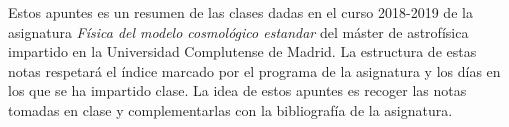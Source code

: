Estos apuntes es un resumen de las clases dadas en el curso 2018-2019 de la asignatura \textit{Física del modelo cosmológico estandar} del máster de astrofísica impartido en la Universidad Complutense de Madrid. La estructura de estas notas respetará el índice marcado por el programa de la asignatura y los días en los que se ha impartido clase. La idea de estos apuntes es recoger las notas tomadas en clase y complementarlas con la bibliografía de la asignatura. 